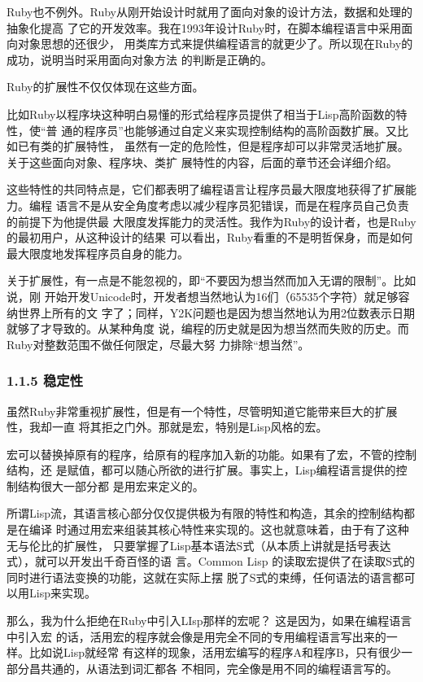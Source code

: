 \documentclass[color=cyan,mathpazo,titlestyle=hang]{elegantbook}
\begin{document}
Ruby也不例外。Ruby从刚开始设计时就用了面向对象的设计方法，数据和处理的抽象化提高
了它的开发效率。我在1993年设计Ruby时，在脚本编程语言中采用面向对象思想的还很少，
用类库方式来提供编程语言的就更少了。所以现在Ruby的成功，说明当时采用面向对象方法
的判断是正确的。

Ruby的扩展性不仅仅体现在这些方面。

比如Ruby以程序块这种明白易懂的形式给程序员提供了相当于Lisp高阶函数的特性，使“普
通的程序员”也能够通过自定义来实现控制结构的高阶函数扩展。又比如已有类的扩展特性，
虽然有一定的危险性，但是程序却可以非常灵活地扩展。关于这些面向对象、程序块、类扩
展特性的内容，后面的章节还会详细介绍。

这些特性的共同特点是，它们都表明了编程语言让程序员最大限度地获得了扩展能力。编程
语言不是从安全角度考虑以减少程序员犯错误，而是在程序员自己负责的前提下为他提供最
大限度发挥能力的灵活性。我作为Ruby的设计者，也是Ruby的最初用户，从这种设计的结果
可以看出，Ruby看重的不是明哲保身，而是如何最大限度地发挥程序员自身的能力。

关于扩展性，有一点是不能忽视的，即“不要因为想当然而加入无谓的限制”。比如说，刚
开始开发Unicode时，开发者想当然地认为16们（65535个字符）就足够容纳世界上所有的文
字了；同样，Y2K问题也是因为想当然地认为用2位数表示日期就够了才导致的。从某种角度
说，编程的历史就是因为想当然而失败的历史。而Ruby对整数范围不做任何限定，尽最大努
力排除“想当然”。

\subsubsection{1.1.5 稳定性}
\label{sec:org3462768}

虽然Ruby非常重视扩展性，但是有一个特性，尽管明知道它能带来巨大的扩展性，我却一直
将其拒之门外。那就是宏，特别是Lisp风格的宏。

宏可以替换掉原有的程序，给原有的程序加入新的功能。如果有了宏，不管的控制结构，还
是赋值，都可以随心所欲的进行扩展。事实上，Lisp编程语言提供的控制结构很大一部分都
是用宏来定义的。

所谓Lisp流，其语言核心部分仅仅提供极为有限的特性和构造，其余的控制结构都是在编译
时通过用宏来组装其核心特性来实现的。这也就意味着，由于有了这种无与伦比的扩展性，
只要掌握了Lisp基本语法S式（从本质上讲就是括号表达式），就可以开发出千奇百怪的语
言。Common Lisp 的读取宏提供了在读取S式的同时进行语法变换的功能，这就在实际上摆
脱了S式的束缚，任何语法的语言都可以用Lisp来实现。

那么，我为什么拒绝在Ruby中引入LIsp那样的宏呢？ 这是因为，如果在编程语言中引入宏
的话，活用宏的程序就会像是用完全不同的专用编程语言写出来的一样。比如说Lisp就经常
有这样的现象，活用宏编写的程序A和程序B，只有很少一部分昌共通的，从语法到词汇都各
不相同，完全像是用不同的编程语言写的。
\end{document}
